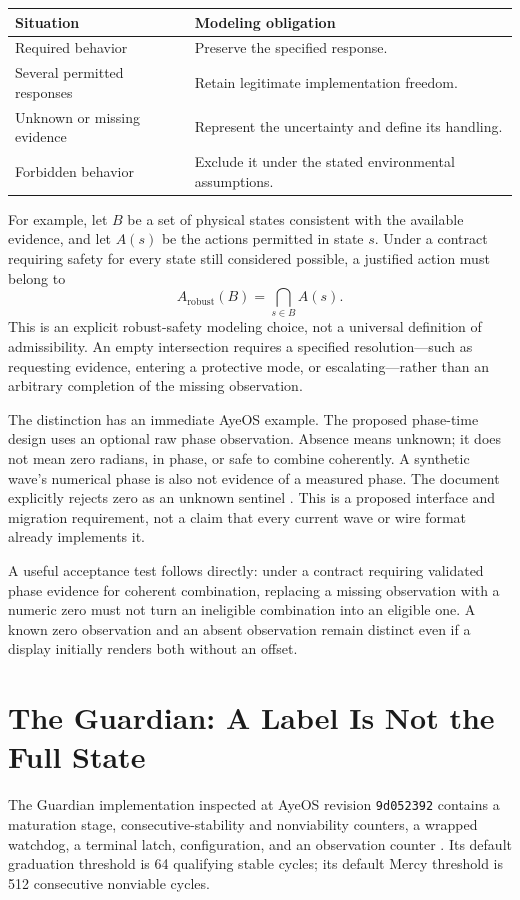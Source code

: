 \documentclass[11pt]{article}
\begin{document}
\begin{center}
\begin{tabularx}{\textwidth}{@{}YY@{}}
\toprule
Situation & Modeling obligation\\\midrule
Required behavior & Preserve the specified response.\\
Several permitted responses & Retain legitimate implementation freedom.\\
Unknown or missing evidence & Represent the uncertainty and define its handling.\\
Forbidden behavior & Exclude it under the stated environmental assumptions.\\
\bottomrule
\end{tabularx}
\end{center}

For example, let $B$ be a set of physical states consistent with the available evidence, and let $A(s)$ be the actions permitted in state $s$. Under a contract requiring safety for every state still considered possible, a justified action must belong to
\[
A_{\mathrm{robust}}(B)=\bigcap_{s\in B}A(s).
\]
This is an explicit robust-safety modeling choice, not a universal definition of admissibility. An empty intersection requires a specified resolution---such as requesting evidence, entering a protective mode, or escalating---rather than an arbitrary completion of the missing observation.

The distinction has an immediate AyeOS example. The proposed phase-time design uses an optional raw phase observation. Absence means unknown; it does not mean zero radians, in phase, or safe to combine coherently. A synthetic wave's numerical phase is also not evidence of a measured phase. The document explicitly rejects zero as an unknown sentinel \cite{aye-phase}. This is a proposed interface and migration requirement, not a claim that every current wave or wire format already implements it.

A useful acceptance test follows directly: under a contract requiring validated phase evidence for coherent combination, replacing a missing observation with a numeric zero must not turn an ineligible combination into an eligible one. A known zero observation and an absent observation remain distinct even if a display initially renders both without an offset.

\section{The Guardian: A Label Is Not the Full State}
The Guardian implementation inspected at AyeOS revision \texttt{9d052392} contains a maturation stage, consecutive-stability and nonviability counters, a wrapped watchdog, a terminal latch, configuration, and an observation counter \cite{aye-guardian}. Its default graduation threshold is 64 qualifying stable cycles; its default Mercy threshold is 512 consecutive nonviable cycles.
\end{document}

